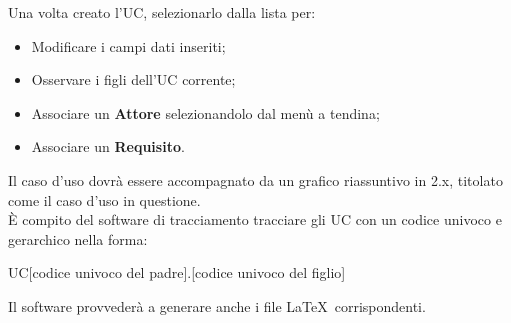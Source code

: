       Una volta creato l'UC, selezionarlo dalla lista per:
      \begin{itemize}
        \item Modificare i campi dati inseriti;
        \item Osservare i figli dell'UC corrente;
        \item Associare un \textbf{Attore} selezionandolo dal menù a tendina;
        \item Associare un \textbf{Requisito}.
      \end{itemize}
      Il caso d'uso dovrà essere accompagnato da un grafico riassuntivo in 2.x, titolato come il caso d'uso in questione.\\
      È compito del software di tracciamento tracciare gli UC con un codice univoco e gerarchico nella forma:
      \begin{center}
        UC[codice univoco del padre].[codice univoco del figlio]
      \end{center}
      Il software provvederà a generare anche i file \LaTeX\ corrispondenti.
